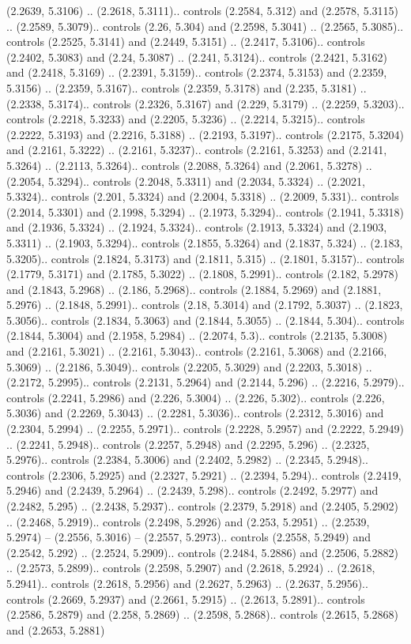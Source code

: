 (2.2639, 5.3106) .. (2.2618, 5.3111).. controls (2.2584, 5.312) and (2.2578, 5.3115) .. (2.2589, 5.3079).. controls (2.26, 5.304) and (2.2598, 5.3041) .. (2.2565, 5.3085).. controls (2.2525, 5.3141) and (2.2449, 5.3151) .. (2.2417, 5.3106).. controls (2.2402, 5.3083) and (2.24, 5.3087) .. (2.241, 5.3124).. controls (2.2421, 5.3162) and (2.2418, 5.3169) .. (2.2391, 5.3159).. controls (2.2374, 5.3153) and (2.2359, 5.3156) .. (2.2359, 5.3167).. controls (2.2359, 5.3178) and (2.235, 5.3181) .. (2.2338, 5.3174).. controls (2.2326, 5.3167) and (2.229, 5.3179) .. (2.2259, 5.3203).. controls (2.2218, 5.3233) and (2.2205, 5.3236) .. (2.2214, 5.3215).. controls (2.2222, 5.3193) and (2.2216, 5.3188) .. (2.2193, 5.3197).. controls (2.2175, 5.3204) and (2.2161, 5.3222) .. (2.2161, 5.3237).. controls (2.2161, 5.3253) and (2.2141, 5.3264) .. (2.2113, 5.3264).. controls (2.2088, 5.3264) and (2.2061, 5.3278) .. (2.2054, 5.3294).. controls (2.2048, 5.3311) and (2.2034, 5.3324) .. (2.2021, 5.3324).. controls (2.201, 5.3324) and (2.2004, 5.3318) .. (2.2009, 5.331).. controls (2.2014, 5.3301) and (2.1998, 5.3294) .. (2.1973, 5.3294).. controls (2.1941, 5.3318) and (2.1936, 5.3324) .. (2.1924, 5.3324).. controls (2.1913, 5.3324) and (2.1903, 5.3311) .. (2.1903, 5.3294).. controls (2.1855, 5.3264) and (2.1837, 5.324) .. (2.183, 5.3205).. controls (2.1824, 5.3173) and (2.1811, 5.315) .. (2.1801, 5.3157).. controls (2.1779, 5.3171) and (2.1785, 5.3022) .. (2.1808, 5.2991).. controls (2.182, 5.2978) and (2.1843, 5.2968) .. (2.186, 5.2968).. controls (2.1884, 5.2969) and (2.1881, 5.2976) .. (2.1848, 5.2991).. controls (2.18, 5.3014) and (2.1792, 5.3037) .. (2.1823, 5.3056).. controls (2.1834, 5.3063) and (2.1844, 5.3055) .. (2.1844, 5.304).. controls (2.1844, 5.3004) and (2.1958, 5.2984) .. (2.2074, 5.3).. controls (2.2135, 5.3008) and (2.2161, 5.3021) .. (2.2161, 5.3043).. controls (2.2161, 5.3068) and (2.2166, 5.3069) .. (2.2186, 5.3049).. controls (2.2205, 5.3029) and (2.2203, 5.3018) .. (2.2172, 5.2995).. controls (2.2131, 5.2964) and (2.2144, 5.296) .. (2.2216, 5.2979).. controls (2.2241, 5.2986) and (2.226, 5.3004) .. (2.226, 5.302).. controls (2.226, 5.3036) and (2.2269, 5.3043) .. (2.2281, 5.3036).. controls (2.2312, 5.3016) and (2.2304, 5.2994) .. (2.2255, 5.2971).. controls (2.2228, 5.2957) and (2.2222, 5.2949) .. (2.2241, 5.2948).. controls (2.2257, 5.2948) and (2.2295, 5.296) .. (2.2325, 5.2976).. controls (2.2384, 5.3006) and (2.2402, 5.2982) .. (2.2345, 5.2948).. controls (2.2306, 5.2925) and (2.2327, 5.2921) .. (2.2394, 5.294).. controls (2.2419, 5.2946) and (2.2439, 5.2964) .. (2.2439, 5.298).. controls (2.2492, 5.2977) and (2.2482, 5.295) .. (2.2438, 5.2937).. controls (2.2379, 5.2918) and (2.2405, 5.2902) .. (2.2468, 5.2919).. controls (2.2498, 5.2926) and (2.253, 5.2951) .. (2.2539, 5.2974) -- (2.2556, 5.3016) -- (2.2557, 5.2973).. controls (2.2558, 5.2949) and (2.2542, 5.292) .. (2.2524, 5.2909).. controls (2.2484, 5.2886) and (2.2506, 5.2882) .. (2.2573, 5.2899).. controls (2.2598, 5.2907) and (2.2618, 5.2924) .. (2.2618, 5.2941).. controls (2.2618, 5.2956) and (2.2627, 5.2963) .. (2.2637, 5.2956).. controls (2.2669, 5.2937) and (2.2661, 5.2915) .. (2.2613, 5.2891).. controls (2.2586, 5.2879) and (2.258, 5.2869) .. (2.2598, 5.2868).. controls (2.2615, 5.2868) and (2.2653, 5.2881) 